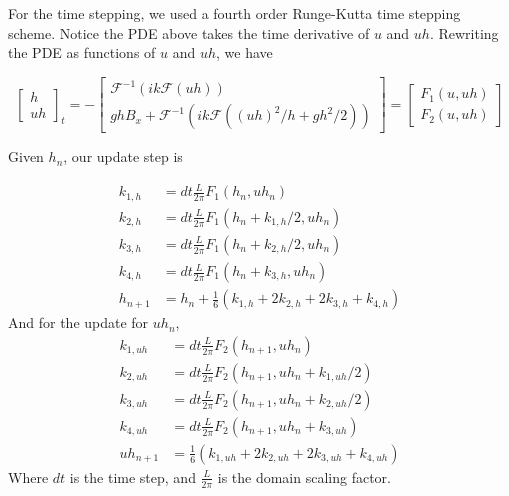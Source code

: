 For the time stepping, we used a fourth order Runge-Kutta time stepping scheme. Notice the PDE above takes the time derivative of $u$ and $uh$. Rewriting the PDE as functions of $u$ and $uh$, we have

$$
\renewcommand*{\arraystretch}{1.5}
\begin{bmatrix}
    h\\
    uh
\end{bmatrix}_t = -\begin{bmatrix}
    \mathcal{F}^{-1}(ik\mathcal{F}(uh))\\
    ghB_x + \mathcal{F}^{-1}(ik\mathcal{F}((uh)^2/h + gh^2/2)) 
\end{bmatrix} = \begin{bmatrix}
    F_1(u,uh)\\
    F_2(u,uh)
\end{bmatrix}
$$

Given $h_n$, our update step is

\begin{align*}
    k_{1,h} &= dt\frac{L}{2\pi}F_1(h_n, uh_n)\\
    k_{2,h} &= dt\frac{L}{2\pi}F_1(h_n + k_{1,h}/2, uh_n)\\
    k_{3,h} &= dt\frac{L}{2\pi}F_1(h_n + k_{2,h}/2, uh_n)\\
    k_{4,h} &= dt\frac{L}{2\pi}F_1(h_n + k_{3,h}, uh_n)\\
    h_{n+1} &= h_n + \frac{1}{6}(k_{1,h} + 2k_{2,h} + 2k_{3,h} + k_{4,h})
\end{align*}
And for the update for $uh_n$,
\begin{align*}
    k_{1,uh} &= dt\frac{L}{2\pi}F_2(h_{n+1}, uh_n)\\
    k_{2,uh} &= dt\frac{L}{2\pi}F_2(h_{n+1}, uh_n + k_{1,uh}/2)\\
    k_{3,uh} &= dt\frac{L}{2\pi}F_2(h_{n+1}, uh_n + k_{2,uh}/2)\\
    k_{4,uh} &= dt\frac{L}{2\pi}F_2(h_{n+1}, uh_n + k_{3,uh})\\
    uh_{n+1} &= \frac{1}{6}(k_{1,uh} + 2k_{2,uh} + 2k_{3,uh} + k_{4,uh})
\end{align*}
Where $dt$ is the time step, and $\frac{L}{2\pi}$ is the domain scaling factor.